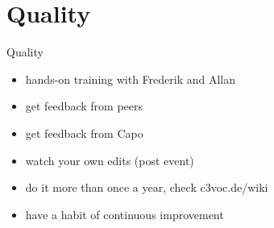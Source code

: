 \documentclass[hyperref={pdfpagelabels=false}]{beamer}
\begin{document}
\section{Quality} 
\begin{frame}{Quality}
\begin{itemize}[<+->]
\item  hands-on training with Frederik and Allan %
\item  get feedback from peers %
\item  get feedback from Capo %
\item  watch your own edits (post event) %
\item  do it more than once a year, check c3voc.de/wiki %
\item  have a habit of continuous improvement %
\end{itemize} 
\end{frame}
\end{document}
